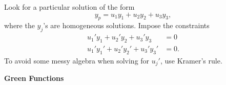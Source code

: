 {%
\begin{Hint}
  \label{hint resonant non-resonant forcing}
\end{Hint}




\begin{Hint}
  \label{hint y+p2y+p1y+p0y=f}
  Look for a particular solution of the form
  \[ y_p = u_1 y_1 + u_2 y_2 + u_3 y_3, \]
  where the $y_j$'s are homogeneous solutions.  Impose the constraints
  \begin{align*}
    u_1' y_1 + u_2' y_2 + u_3' y_3 &= 0 \\
    u_1' y_1'+ u_2' y_2'+ u_3' y_3'&= 0.
  \end{align*}
  To avoid some messy algebra when solving for $u_j'$, use Kramer's rule.
\end{Hint}

\begin{large}
  \noindent
  \textbf{Green Functions}
\end{large}

\begin{Hint}
  \label{hint y=f y=y=0}
\end{Hint}




\begin{Hint}
  \label{hint y+1xy-1x2y=x2}
\end{Hint}




\begin{Hint}
  \label{hint continuity y+p2y+p1y+p0y=f}
\end{Hint}





\begin{Hint}
  \label{hint x2y-2xy+2y=e-x}
\end{Hint}





}
